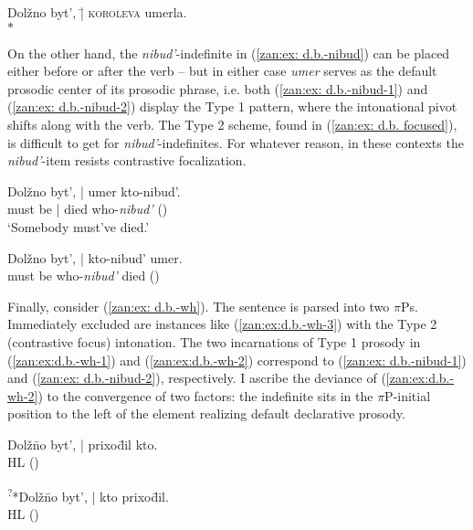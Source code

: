 \documentclass[output=paper,colorlinks,citecolor=brown]{langscibook}
\begin{document}
\ex \label{zan:ex: d.b. focused}
    \begin{tabbing}  Dolžno byt', \= | \textsc{korol}\= \textsc{eva} umerla.\\ \>  \> $\ast$
    \end{tabbing}
\z
\z

 \noindent On the other hand, the \textit{nibud'}-indefinite in (\ref{zan:ex: d.b.-nibud}) can be placed either before or after the verb -- but in either case \textit{umer} serves as the default prosodic center of its prosodic phrase, i.e. both (\ref{zan:ex: d.b.-nibud-1}) and (\ref{zan:ex: d.b.-nibud-2}) display the Type 1 pattern, where the intonational pivot shifts along with the verb. The Type 2 scheme, found in (\ref{zan:ex: d.b. focused}), is difficult to get for \textit{nibud'}-indefinites. For whatever reason, in these contexts the \textit{nibud'}-item resists contrastive focalization.

\ea \label{zan:ex: d.b.-nibud}
\ea \label{zan:ex: d.b.-nibud-1}
   \gll Dolžno byt', | umer kto-nibud'.\\
       must be | died who-\textit{nibud'} (\searrow)\\
       \glt `Somebody must've died.' 
       
\ex \label{zan:ex: d.b.-nibud-2}
     \gll Dolžno byt', | kto-nibud' umer.\\
     must be {} who-\textit{nibud'} died (\searrow)\\
\z
\z

\noindent Finally, consider (\ref{zan:ex: d.b.-wh}). The sentence is parsed into two $\pi$Ps. Immediately excluded are instances like (\ref{zan:ex:d.b.-wh-3}) with the Type 2 (contrastive focus) intonation. The two incarnations of Type 1 prosody in (\ref{zan:ex:d.b.-wh-1}) and (\ref{zan:ex:d.b.-wh-2}) correspond to (\ref{zan:ex: d.b.-nibud-1}) and (\ref{zan:ex: d.b.-nibud-2}), respectively. I ascribe the deviance of (\ref{zan:ex:d.b.-wh-2}) to the convergence of two factors: the indefinite sits in the $\pi$P-initial position to the left of the element realizing default declarative prosody.  

\ea \label{zan:ex: d.b.-wh}
\ea\label{zan:ex:d.b.-wh-1}
  \begin{tabbing} Dolž\=no byt', | prixo\=dil kto.\\
        \>  \> HL (\searrow)
    \end{tabbing}
      
       
\ex \label{zan:ex:d.b.-wh-2} \begin{tabbing} \textsuperscript{?}*Dolž\=no byt', | kto prixo\=dil.\\
    \>  \>  HL (\searrow)
        \end{tabbing}
\end{document}

